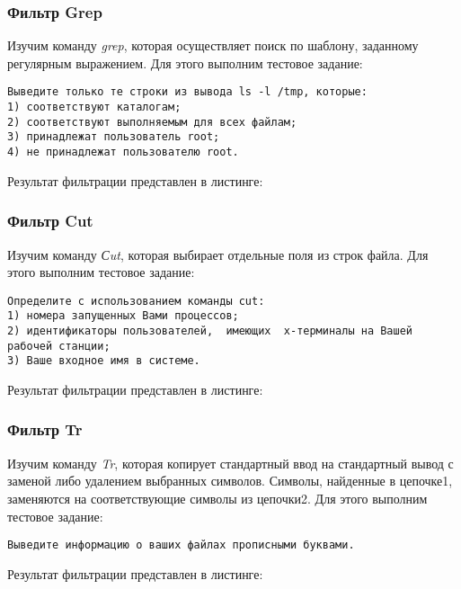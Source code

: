 \documentclass[14pt,a4paper,report]{report}
\begin{document}
\subsubsection{Фильтр Grep}

Изучим команду \emph{grep}, которая осуществляет поиск по шаблону, заданному регулярным выражением. Для этого выполним тестовое задание:

\begin{verbatim}
Выведите только те строки из вывода ls -l /tmp, которые: 
1) соответствуют каталогам; 
2) соответствуют выполняемым для всех файлам; 
3) принадлежат пользователь root; 
4) не принадлежат пользователю root.
\end{verbatim}

Результат фильтрации представлен в листинге:



\subsubsection{Фильтр Cut}

Изучим команду \emph{Сut}, которая выбирает отдельные поля из строк файла. Для этого выполним тестовое задание:

\begin{verbatim}
Определите с использованием команды cut: 
1) номера запущенных Вами процессов; 
2) идентификаторы пользователей,  имеющих  x-терминалы на Вашей рабочей станции; 
3) Ваше входное имя в системе.
\end{verbatim}

Результат фильтрации представлен в листинге:



\subsubsection{Фильтр Tr}

Изучим команду \emph{Tr}, которая копирует стандартный ввод на стандартный вывод с заменой либо удалением выбранных символов.  Символы, найденные в цепочке1,  заменяются  на  соответствующие  символы из цепочки2. Для этого выполним тестовое задание:

\begin{verbatim}
Выведите информацию о ваших файлах прописными буквами.
\end{verbatim}

Результат фильтрации представлен в листинге:
\end{document}
